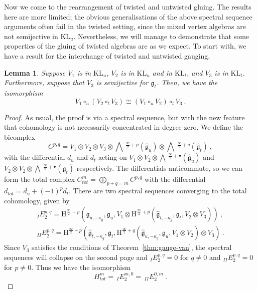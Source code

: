 \documentclass[a4paper]{article}
\newtheorem{lem}[thm]{Lemma}
\def\gf{\mathfrak{g}}
\def \KL{\mathrm{KL}}
\newcommand{\Hi}[1]{\mathrm{H}^{\frac{\infty}{2}+#1}}
\newcommand{\Li}[1]{\mathrm{\bigwedge}\,^{\frac{\infty}{2}+#1}}
\begin{document}
Now we come to the rearrangement of twisted and untwisted gluing. The results here are more limited; the obvious generalisations of the above spectral sequence arguments often fail in the twisted setting, since the mixed vertex algebras are not semijective in $\KL_u$. Nevertheless, we will manage to demonstrate that some properties of the gluing of twisted algebras are as we expect. To start with, we have a result for the interchange of twisted and untwisted gauging.
\begin{lem}\label{lem:gauge_ut}
Suppose $V_1$ is in $\KL_u$, $V_2$ is in $\KL_u$ and in $\KL_t$, and $V_3$ is in $\KL_t$. Furthermore, suppose that $V_3$ is semijective for $\gf_t$. Then, we have the isomorphism
\begin{equation*}
	V_1\circ_u(V_2\circ_t V_3) \cong (V_1\circ_uV_2)\circ_tV_3~.
\end{equation*}
\end{lem}
\begin{proof}
As usual, the proof is via a spectral sequence, but with the new feature that cohomology is not necessarily concentrated in degree zero. We define the bicomplex
\begin{equation*}
	C^{p,q} = V_1\otimes V_2\otimes V_3 \otimes \Li{p}(\hat{\gf}_u)\otimes \Li{q}(\hat{\gf}_t)~,
\end{equation*}
with the differential $d_u$ and $d_t$ acting on $V_1\otimes V_2\otimes\Li{\bullet}(\hat{\gf}_u)$ and $V_2\otimes V_2\otimes \Li{\bullet}(\hat{\gf}_t)$ respectively. The differentials anticommute, so we can form the total complex $C_{tot}^m = \bigoplus_{p+q=m}C^{p,q}$ with the differential $d_{tot}= d_u +(-1)^p d_t$. There are two spectral sequences converging to the total cohomology, given by
\begin{equation}\nonumber
	\begin{split}
	_{I} E_2^{p,q} = \Hi{p}(\hat{\gf}_{u,-\kappa_g},\gf_u,V_1\otimes\Hi{p}(\hat{\gf}_{t,-\kappa_g},\gf_t,V_2\otimes V_3))~,\\
	_{II} E^{p,q}_2 = \Hi{p}(\hat{\gf}_{t,-\kappa_g},\gf_t,\Hi{q}(\hat{\gf}_{u,-\kappa_g},\gf_u,V_1\otimes V_2)\otimes V_3)~.
	\end{split}
\end{equation}
Since $V_3$ satisfies the conditions of Theorem~\ref{thm:gauge-van}, the spectral sequences will collapse on the second page and $_{I} E^{p,q}_2=0$ for $q\neq0$ and $_{II} E^{p,q}_2 =0$ for $p\neq0$. Thus we have the isomorphism
\begin{equation*}
	H^m_{tot} =\, _{I} E^{m,0}_2 =\, _{II} E^{0,m}_2~.
\end{equation*}
\end{proof}
\vspace{-6pt}
\end{document}
